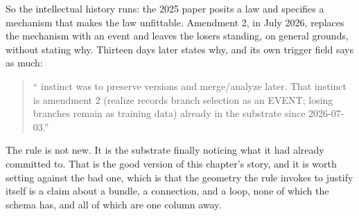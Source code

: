 So the intellectual history runs: the 2025 paper posits a law and specifies a mechanism that makes the law unfittable. Amendment 2, in July 2026, replaces the mechanism with an event and leaves the losers standing, on general grounds, without stating why. Thirteen days later  states why, and its own trigger field says as much:

\begin{quote}
``\labPI{} instinct was to preserve versions and merge/analyze later. That instinct is amendment 2 (realize records branch selection as an EVENT; losing branches remain as training data) already in the substrate since 2026-07-03.''
\end{quote}

The rule is not new. It is the substrate finally noticing what it had already committed to. That is the good version of this chapter's story, and it is worth setting against the bad one, which is that the geometry the rule invokes to justify itself is a claim about a bundle, a connection, and a loop, none of which the schema has, and all of which are one column away.
